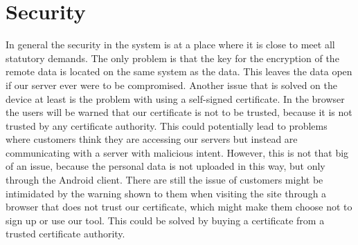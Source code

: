 
\section{Security}
\label{sec:security}

In general the security in the system is at a place where it is close to meet all statutory demands. The only problem is that the key for the encryption of the remote data is located on the same system as the data. This leaves the data open if our server ever were to be compromised. Another issue that is solved on the device at least is the problem with using a self-signed certificate. In the browser the users will be warned that our certificate is not to be trusted, because it is not trusted by any certificate authority. This could potentially lead to problems where customers think they are accessing our servers but instead are communicating with a server with malicious intent. However, this is not that big of an issue, because the personal data is not uploaded in this way, but only through the Android client. There are still the issue of customers might be intimidated by the warning shown to them when visiting the site through a browser that does not trust our certificate, which might make them choose not to sign up or use our tool. This could be solved by buying a certificate from a trusted certificate authority. 
